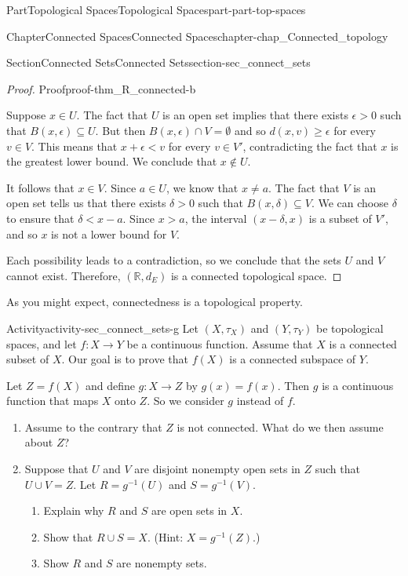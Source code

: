 \documentclass[oneside,10pt,]{book}
\numberwithin{equation}{chapter}
\newcommand{\R}{\mathbb{R}}
\newcommand{\lt}{<}
\newcommand{\gt}{>}
\begin{document}
\begin{partptx}{Part}{Topological Spaces}{}{Topological Spaces}{}{}{part-part-top-spaces}
\begin{chapterptx}{Chapter}{Connected Spaces}{}{Connected Spaces}{}{}{chapter-chap_Connected_topology}
\begin{sectionptx}{Section}{Connected Sets}{}{Connected Sets}{}{}{section-sec_connect_sets}
\begin{proof}{Proof}{}{proof-thm_R_connected-b}
\par
Suppose \(x \in U\). The fact that \(U\) is an open set implies that there exists \(\epsilon \gt 0\) such that \(B(x, \epsilon) \subseteq U\). But then \(B(x, \epsilon) \cap V = \emptyset\) and so \(d(x,v) \geq \epsilon\) for every \(v \in V\). This means that \(x+\epsilon \lt v\) for every \(v \in V'\), contradicting the fact that \(x\) is the greatest lower bound. We conclude that \(x \notin U\).%
\par
It follows that \(x \in V\). Since \(a \in U\), we know that \(x \neq a\). The fact that \(V\) is an open set tells us that there exists \(\delta \gt 0\) such that \(B(x, \delta) \subseteq V\). We can choose \(\delta\) to ensure that \(\delta \lt x-a\). Since \(x > a\), the interval \((x-\delta,
x)\) is a subset of \(V'\), and so \(x\) is not a lower bound for \(V\).%
\par
Each possibility leads to a contradiction, so we conclude that the sets \(U\) and \(V\) cannot exist. Therefore, \((\R, d_E)\) is a connected topological space.%
\end{proof}
As you might expect, connectedness is a topological property.%
\begin{activity}{Activity}{}{activity-sec_connect_sets-g}%
Let \((X, \tau_X)\) and \((Y, \tau_Y)\) be topological spaces, and let \(f : X \to Y\) be a continuous function. Assume that \(X\) is a connected subset of \(X\). Our goal is to prove that \(f(X)\) is a connected subspace of \(Y\).%
\par
Let \(Z = f(X)\) and define \(g: X \to Z\) by \(g(x) = f(x)\). Then \(g\) is a continuous function that maps \(X\) onto \(Z\). So we consider \(g\) instead of \(f\).%
\begin{enumerate}[font=\bfseries,label=(\alph*),ref=\alph*]%
\item{}Assume to the contrary that \(Z\) is not connected. What do we then assume about \(Z\)?%
\item{}Suppose that \(U\) and \(V\) are disjoint nonempty open sets in \(Z\) such that \(U \cup V = Z\). Let \(R = g^{-1}(U)\) and \(S = g^{-1}(V)\).%
\begin{enumerate}[font=\bfseries,label=(\roman*),ref=\theenumi.\roman*]%
\item{}Explain why \(R\) and \(S\) are open sets in \(X\).%
\item{}Show that \(R \cup S = X\). (Hint: \(X = g^{-1}(Z)\).)%
\item{}Show \(R\) and \(S\) are nonempty sets.%
\par\smallskip%

\end{enumerate}
\end{enumerate}
\end{activity}
\end{sectionptx}
\end{chapterptx}
\end{partptx}
\end{document}
